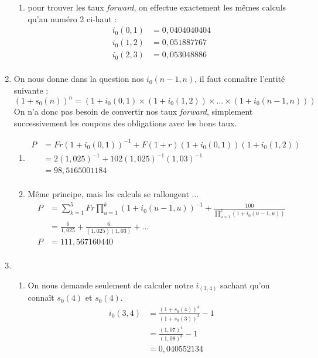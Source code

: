 \begin{enumerate}
\begin{enumerate}[label=\alph*)]
    \item pour trouver les taux \emph{forward}, on effectue exactement les mêmes
    calculs qu'au numéro 2 ci-haut :
    \begin{align*}
      i_0(0,1)  & = 0,0404040404 \\
      i_0(1,2)  & = 0,051887767 \\
      i_0(2,3)  & = 0,053048886 \\
    \end{align*}
  \end{enumerate} %
  \item On nous donne dans la   question nos $i_0(n-1,n)$, il faut connaître
  l'entité suivante :
  \begin{displaymath}
    (1+s_0(n))^n = (1 + i_0(0,1) \times (1+i_0(1,2)) \times ... \times (1+i_0(n-1,n)))
  \end{displaymath}
  On n'a donc pas besoin de convertir nos taux \emph{forward}, simplement
  successivement les coupons des obligations avec les bons taux.
  \begin{enumerate}[label=\alph*)]
    \item
    \begin{align*}
      P     & = Fr(1+i_0(0,1))^{-1} + F(1+r)(1+i_0(0,1))(1+i_0(1,2)) \\
            & = 2(1,025)^{-1} + 102(1,025)^{-1}(1,03)^{-1} \\
            & = 98,5165001184 \\
    \end{align*}
    \item Même principe, mais les calculs se rallongent ...
    \begin{align*}
    P   & = \sum_{k=1}^5 Fr \prod_{u=1}^k (1+i_0(u-1,u))^{-1} + \frac{100}{\prod_{u=1}^5 (1+i_0(u-1,u))} \\
        & = \frac{6}{1,025} + \frac{6}{(1,025)(1,03)} + ... \\
    P   & = 111,567160440 \\
    \end{align*}
  \end{enumerate} %
\item
\begin{enumerate}
  \item On nous demande seulement de calculer notre $i_(3,4)$ sachant qu'on connaît
  $s_0(4)$ et $s_0(4)$.
  \p
  \begin{align*}
    i_0(3,4)  & = \frac{(1+s_0(4))^4}{(1+s_0(3))^3}-1 \\
              & = \frac{(1,07)^4}{(1,08)^3} -1 \\
              & = 0,040552134 \\
  \end{align*}


\end{enumerate}
\end{enumerate}
